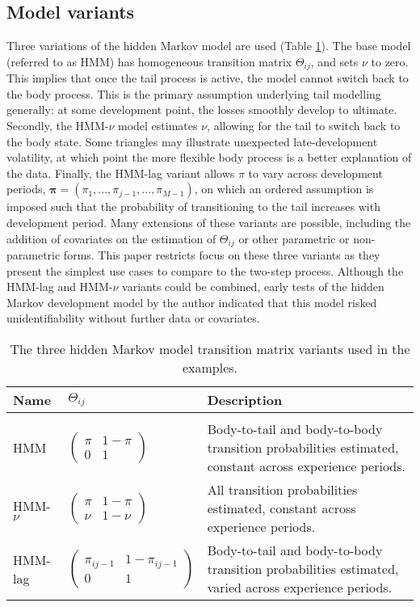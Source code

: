 \subsection{Model variants}
Three variations of the hidden Markov model are used (Table \ref{table:variants}). 
The base model (referred to as HMM) has homogeneous transition matrix $\Theta_{ij}$,
and sets $\nu$ to zero. This implies that once the tail
process is active, the model cannot switch back to the
body process. This is the primary assumption underlying
tail modelling generally: at some development point, the 
losses smoothly develop to ultimate. Secondly, the HMM-$\nu$
model estimates $\nu$, allowing for the tail to switch
back to the body state. Some triangles may illustrate
unexpected late-development volatility, at which point
the more flexible body process is a better explanation
of the data. Finally, the HMM-lag variant allows $\pi$
to vary across development periods, $\bm{\pi} = (\pi_{1}, 
..., \pi_{j - 1}, ..., \pi_{M - 1})$, on which 
an ordered assumption is imposed such that the probability
of transitioning to the tail increases with development period.
Many extensions of these variants are possible, including
the addition of covariates on the estimation of
$\Theta_{ij}$ or other parametric or non-parametric
forms. This paper restricts focus on these three
variants as they present the simplest use cases
to compare to the two-step process. Although
the HMM-lag and HMM-$\nu$ variants could be combined,
early tests of the hidden Markov development model
by the author indicated that this model risked unidentifiability
without further data or covariates.

\begin{table}
    \centering
    \begin{tabular}{p{2cm}|p{3.5cm}|p{7cm}}
        Name & $\Theta_{ij}$ & Description \\
        \hline\\
        HMM & $\begin{pmatrix} \pi & 1 - \pi \\ 0 & 1 \end{pmatrix}$ & 
        Body-to-tail and body-to-body transition probabilities estimated, constant
        across experience periods.\\
        HMM-$\nu$ & $\begin{pmatrix} \pi & 1 - \pi \\ \nu & 1 - \nu \end{pmatrix}$ &
        All transition probabilities estimated, constant across experience periods.\\
        HMM-lag & $\begin{pmatrix} \pi_{ij-1} & 1 - \pi_{ij-1} \\ 0 & 1 \end{pmatrix}$ &
        Body-to-tail and body-to-body transition probabilities estimated,
        varied across experience periods.\\
    \end{tabular}
    \caption{
        The three hidden Markov model transition matrix variants
        used in the examples.
    }
    \label{table:variants}
\end{table}

